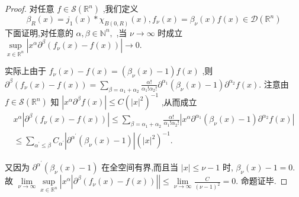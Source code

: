 \documentclass[lang=cn,newtx,10pt,scheme=chinese,thmcnt=chapter]{elegantbook}
\begin{document}
\begin{proof}
对任意 \( f \in  \mathcal{S}\left( {\mathbb{R}}^{n}\right) \) ,我们定义
    \[\beta_R(x)=j_1(x)* \chi_{B(0,R)}(x),{f}_{\nu }\left( x\right)  = {\beta }_{\nu }\left( x\right) f\left( x\right)  \in  \mathcal{D}\left( {\mathbb{R}}^{n}\right) \]
下面证明,对任意的 \( \alpha,\beta  \in  {\mathbb{N}}^{n}, \) ,当 \( \nu  \rightarrow  \infty \) 时成立
\( \mathop{\sup }\limits_{{x \in  {\mathbb{R}}^{n}}}\left| {{x }^{\alpha}{\partial }^{\beta }\left( {{f}_{\nu }\left( x\right)  - f\left( x\right) }\right) }\right|  \rightarrow  0. \)

实际上由于 \( {f}_{\nu }\left( x\right)  - f\left( x\right)  = \left( {{\beta }_{\nu }\left( x\right)  - 1}\right) f\left( x\right) \) ,则
\( {\partial }^{\beta }\left( {{f}_{\nu }\left( x\right)  - f\left( x\right) }\right)  = \mathop{\sum }\limits_{{\beta  = {\alpha }_{1} + {\alpha }_{2}}}\frac{\alpha !}{{\alpha }_{1}!{\alpha }_{2}!}{\partial }^{{\alpha }_{1}}\left( {{\beta }_{\nu }\left( x\right)  - 1}\right) {\partial }^{{\alpha }_{2}}f\left( x\right) . \)
注意由 \( f \in  \mathcal{S}\left( {\mathbb{R}}^{n}\right) \) 知 \( \left| {{x }^{\alpha}{\partial }^{\beta }f\left( x\right) }\right|  \leqslant  C{\left(  {\left| x\right| }^{2}\right) }^{-1} \) ,从而成立
\begin{equation*}
    \begin{aligned}
        {x}^{\alpha}\left| {{\partial }^{\beta }\left( {{f}_{\nu }\left( x\right)  - f\left( x\right) }\right) }\right| 
\leqslant  \mathop{\sum }\limits_{{\beta  = {\alpha }_{1} + {\alpha }_{2}}}\frac{\alpha !}{{\alpha }_{1}!{\alpha }_{2}!}\left| {{x}^{\alpha}{\partial }^{{\alpha }_{1}}\left( {{\beta }_{\nu }\left( x\right)  - 1}\right) {\partial }^{{\alpha }_{2}}f\left( x\right) }\right| \\
 \leqslant  \mathop{\sum }\limits_{{{\alpha }^{\prime} \leqslant  \beta }}{C}_{{\alpha }^{\prime }}\left| {{\partial }^{{\alpha }^{\prime }}\left( {{\beta }_{\nu }\left( x\right)  - 1}\right) }\right| {\left( {\left| x\right| }^{2}\right) }^{-1}. 
    \end{aligned}
\end{equation*}

又因为 \( {\partial }^{{\alpha }^{\prime}}\left( {{\beta }_{\nu }\left( x\right)  - 1}\right) \) 在全空间有界,而且当 \( \left| x\right|  \leqslant  \nu  - 1 \) 时, \( {\beta }_{\nu }\left( x\right)  - 1 = 0\). 故
\( \mathop{\lim }\limits_{{\nu  \rightarrow  \infty }}\mathop{\sup }\limits_{{x \in  {\mathbb{R}}^{n}}}\left|  {x}^{\alpha}\left| {{\partial }^{\beta }\left( {{f}_{\nu }\left( x\right)  - f\left( x\right) }\right) }\right| \right|  \leqslant  \mathop{\lim }\limits_{{\nu  \rightarrow  \infty }}\frac{C}{{\left( \nu  - 1\right) }^{2}} = 0. \)
命题证毕.
\end{proof}
\end{document}
